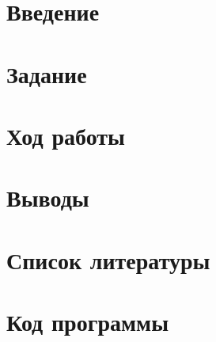 


	
	\tableofcontents
 	\setcounter{page}{2}
	\newpage
	\section*{Введение}
	
	\section*{Задание}
	
	\newpage
	\section*{Ход работы}
	
	\newpage
	\section*{Выводы}
	
	\newpage
	\section*{Список литературы}
	
	\newpage
	\section*{Код программы}
	

